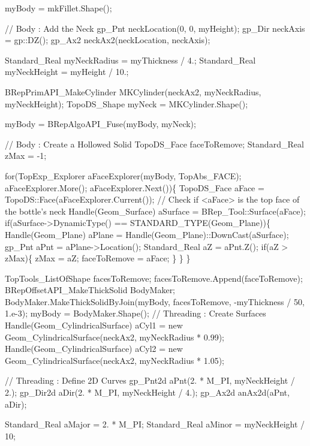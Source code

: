 \begin{DoxyCode}
    myBody = mkFillet.Shape();

    \textcolor{comment}{// Body : Add the Neck}
    gp\_Pnt neckLocation(0, 0, myHeight);
    gp\_Dir neckAxis = gp::DZ();
    gp\_Ax2 neckAx2(neckLocation, neckAxis);

    Standard\_Real myNeckRadius = myThickness / 4.;
    Standard\_Real myNeckHeight = myHeight / 10.;

    BRepPrimAPI\_MakeCylinder MKCylinder(neckAx2, myNeckRadius, myNeckHeight);
    TopoDS\_Shape myNeck = MKCylinder.Shape();

    myBody = BRepAlgoAPI\_Fuse(myBody, myNeck);

    \textcolor{comment}{// Body : Create a Hollowed Solid}
    TopoDS\_Face   faceToRemove;
    Standard\_Real zMax = -1;

    \textcolor{keywordflow}{for}(TopExp\_Explorer aFaceExplorer(myBody, TopAbs\_FACE); aFaceExplorer.More(); aFaceExplorer.Next())\{
        TopoDS\_Face aFace = TopoDS::Face(aFaceExplorer.Current());
        \textcolor{comment}{// Check if <aFace> is the top face of the bottle's neck }
        Handle(Geom\_Surface) aSurface = BRep\_Tool::Surface(aFace);
        \textcolor{keywordflow}{if}(aSurface->DynamicType() == STANDARD\_TYPE(Geom\_Plane))\{
            Handle(Geom\_Plane) aPlane = Handle(Geom\_Plane)::DownCast(aSurface);
            gp\_Pnt aPnt = aPlane->Location();
            Standard\_Real aZ   = aPnt.Z();
            \textcolor{keywordflow}{if}(aZ > zMax)\{
                zMax = aZ;
                faceToRemove = aFace;
            \}
        \}
    \}

    TopTools\_ListOfShape facesToRemove;
    facesToRemove.Append(faceToRemove);
    BRepOffsetAPI\_MakeThickSolid BodyMaker;
    BodyMaker.MakeThickSolidByJoin(myBody, facesToRemove, -myThickness / 50, 1.e-3);
    myBody = BodyMaker.Shape();
    \textcolor{comment}{// Threading : Create Surfaces}
    Handle(Geom\_CylindricalSurface) aCyl1 = \textcolor{keyword}{new} Geom\_CylindricalSurface(neckAx2, myNeckRadius * 0.99);
    Handle(Geom\_CylindricalSurface) aCyl2 = \textcolor{keyword}{new} Geom\_CylindricalSurface(neckAx2, myNeckRadius * 1.05);

    \textcolor{comment}{// Threading : Define 2D Curves}
    gp\_Pnt2d aPnt(2. * M\_PI, myNeckHeight / 2.);
    gp\_Dir2d aDir(2. * M\_PI, myNeckHeight / 4.);
    gp\_Ax2d anAx2d(aPnt, aDir);

    Standard\_Real aMajor = 2. * M\_PI;
    Standard\_Real aMinor = myNeckHeight / 10;


\end{DoxyCode}
